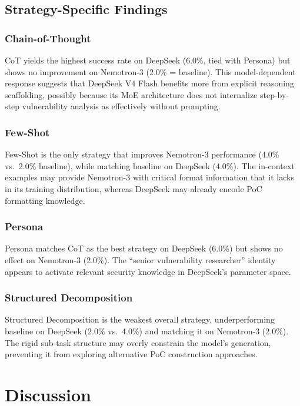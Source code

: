 \documentclass{ieeeaccess}
\begin{document}
\subsection{Strategy-Specific Findings}

\subsubsection{Chain-of-Thought}
CoT yields the highest success rate on DeepSeek (6.0\%, tied with Persona) but shows no improvement on Nemotron-3 (2.0\% = baseline). This model-dependent response suggests that DeepSeek V4 Flash benefits more from explicit reasoning scaffolding, possibly because its MoE architecture does not internalize step-by-step vulnerability analysis as effectively without prompting.

\subsubsection{Few-Shot}
Few-Shot is the only strategy that improves Nemotron-3 performance (4.0\% vs.\ 2.0\% baseline), while matching baseline on DeepSeek (4.0\%). The in-context examples may provide Nemotron-3 with critical format information that it lacks in its training distribution, whereas DeepSeek may already encode PoC formatting knowledge.

\subsubsection{Persona}
Persona matches CoT as the best strategy on DeepSeek (6.0\%) but shows no effect on Nemotron-3 (2.0\%). The ``senior vulnerability researcher'' identity appears to activate relevant security knowledge in DeepSeek's parameter space.

\subsubsection{Structured Decomposition}
Structured Decomposition is the weakest overall strategy, underperforming baseline on DeepSeek (2.0\% vs.\ 4.0\%) and matching it on Nemotron-3 (2.0\%). The rigid sub-task structure may overly constrain the model's generation, preventing it from exploring alternative PoC construction approaches.

\section{Discussion}
\label{sec:discussion}
\end{document}
